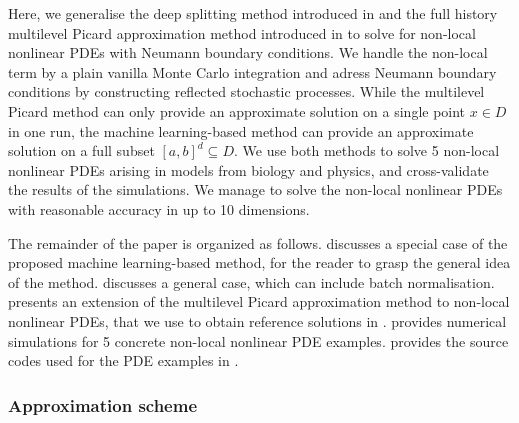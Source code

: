 Here, we generalise the deep splitting method introduced in \cite{Beck2019} and the full history multilevel Picard approximation method introduced in \cite{Weinan2019,Hutzenthaler2020,Weinan2021} to solve for non-local nonlinear PDEs with Neumann boundary conditions. We handle the non-local term by a plain vanilla Monte Carlo integration and adress Neumann boundary conditions by constructing reflected stochastic processes. While the multilevel Picard method can only provide an approximate solution on a single point $x \in D$ in one run, the machine learning-based method can provide an approximate solution on a full subset $[a,b]^d \subseteq D$.
%
We use both methods to solve 5 non-local nonlinear PDEs arising in models from biology and physics, and cross-validate the results of the simulations.
%
We manage to solve the non-local nonlinear PDEs with reasonable accuracy in up to 10 dimensions.

The remainder of the paper is organized as follows.   discusses a special case of the proposed machine learning-based method, for the reader to grasp the general idea of the method.  discusses a general case, which can include batch normalisation.  presents an extension of the multilevel Picard approximation method to non-local nonlinear PDEs, that we use to obtain reference solutions in .  provides numerical simulations for 5 concrete non-local nonlinear PDE examples.  provides the source codes used for the PDE examples in .




\subsubsection*{Approximation scheme}
\cite{Zang2019,Kolluru2019}
%
